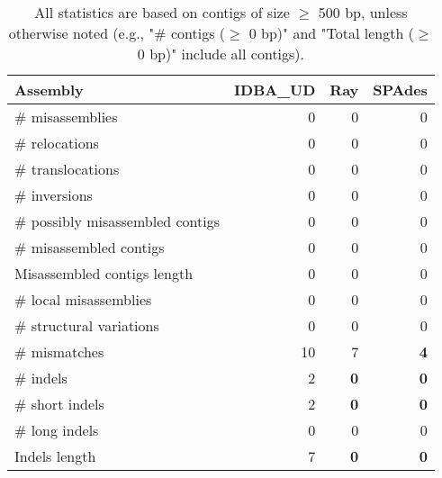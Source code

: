 \documentclass[12pt,a4paper]{article}
\begin{document}
\begin{table}[ht]
\begin{center}
\caption{All statistics are based on contigs of size $\geq$ 500 bp, unless otherwise noted (e.g., "\# contigs ($\geq$ 0 bp)" and "Total length ($\geq$ 0 bp)" include all contigs).}
\begin{tabular}{|l*{3}{|r}|}
\hline
Assembly & IDBA\_UD & Ray & SPAdes \\ \hline
\# misassemblies & 0 & 0 & 0 \\ \hline
\hspace{5mm}\# relocations & 0 & 0 & 0 \\ \hline
\hspace{5mm}\# translocations & 0 & 0 & 0 \\ \hline
\hspace{5mm}\# inversions & 0 & 0 & 0 \\ \hline
\# possibly misassembled contigs & 0 & 0 & 0 \\ \hline
\# misassembled contigs & 0 & 0 & 0 \\ \hline
Misassembled contigs length & 0 & 0 & 0 \\ \hline
\# local misassemblies & 0 & 0 & 0 \\ \hline
\# structural variations & 0 & 0 & 0 \\ \hline
\# mismatches & 10 & 7 & {\bf 4} \\ \hline
\# indels & 2 & {\bf 0} & {\bf 0} \\ \hline
\hspace{5mm}\# short indels & 2 & {\bf 0} & {\bf 0} \\ \hline
\hspace{5mm}\# long indels & 0 & 0 & 0 \\ \hline
Indels length & 7 & {\bf 0} & {\bf 0} \\ \hline
\end{tabular}
\end{center}
\end{table}
\end{document}
